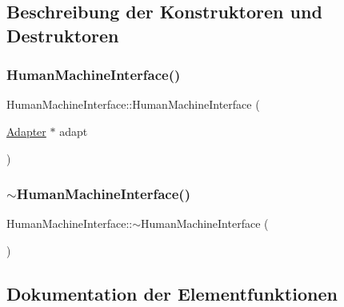 \subsection{Beschreibung der Konstruktoren und Destruktoren}
\hypertarget{class_human_machine_interface_aee37229a726c66857601422ba1605ac6}{}\label{class_human_machine_interface_aee37229a726c66857601422ba1605ac6} 
\subsubsection{\texorpdfstring{Human\+Machine\+Interface()}{HumanMachineInterface()}}
{\footnotesize\ttfamily Human\+Machine\+Interface\+::\+Human\+Machine\+Interface (\begin{DoxyParamCaption}\item[{\hyperlink{class_adapter}{Adapter} $\ast$}]{adapt }\end{DoxyParamCaption})}

\hypertarget{class_human_machine_interface_a2ac7ae9e7e6be379da946eac459ea243}{}\label{class_human_machine_interface_a2ac7ae9e7e6be379da946eac459ea243} 
\subsubsection{\texorpdfstring{$\sim$\+Human\+Machine\+Interface()}{~HumanMachineInterface()}}
{\footnotesize\ttfamily Human\+Machine\+Interface\+::$\sim$\+Human\+Machine\+Interface (\begin{DoxyParamCaption}{ }\end{DoxyParamCaption})\hspace{0.3cm}{\ttfamily [virtual]}}



\subsection{Dokumentation der Elementfunktionen}
\hypertarget{class_human_machine_interface_ad9844e21fd01872ad78afb9e16acc59f}{}\label{class_human_machine_interface_ad9844e21fd01872ad78afb9e16acc59f} 
